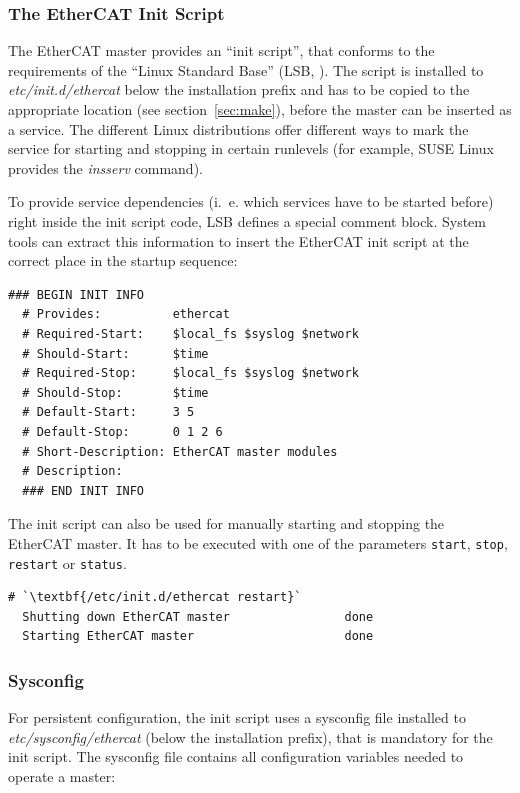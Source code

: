 \documentclass[a4paper,12pt,BCOR6mm,bibtotoc,idxtotoc]{scrbook}
\begin{document}
\subsubsection{The EtherCAT Init Script}
\label{sec:init}

The EtherCAT master provides an ``init script'', that conforms to the
requirements of the ``Linux Standard Base'' (LSB,
\cite{lsb}). The script is installed to \textit{etc/init.d/ethercat}
below the installation prefix and has to be copied to the appropriate
location (see section~\ref{sec:make}), before the master can be
inserted as a service. The different Linux distributions offer
different ways to mark the service for starting and stopping in
certain runlevels (for example, SUSE Linux provides the
\textit{insserv} command).

To provide service dependencies (i.~e. which services have to be
started before) right inside the init script code, LSB defines a
special comment block. System tools can extract this information to
insert the EtherCAT init script at the correct place in the startup
sequence:

\begin{lstlisting}[gobble=2]
  ### BEGIN INIT INFO
  # Provides:          ethercat
  # Required-Start:    $local_fs $syslog $network
  # Should-Start:      $time
  # Required-Stop:     $local_fs $syslog $network
  # Should-Stop:       $time
  # Default-Start:     3 5
  # Default-Stop:      0 1 2 6
  # Short-Description: EtherCAT master modules
  # Description:
  ### END INIT INFO
\end{lstlisting}

The init script can also be used for manually starting and stopping
the EtherCAT master. It has to be executed with one of the parameters
\texttt{start}, \texttt{stop}, \texttt{restart} or \texttt{status}.

\begin{lstlisting}[gobble=2]
  # `\textbf{/etc/init.d/ethercat restart}`
  Shutting down EtherCAT master                done
  Starting EtherCAT master                     done
\end{lstlisting}

\subsubsection{Sysconfig} %
\label{sec:sysconfig}

For persistent configuration, the init script uses a sysconfig file
installed to \textit{etc/sysconfig/ethercat} (below the installation
prefix), that is mandatory for the init script. The sysconfig file
contains all configuration variables needed to operate a master:
\end{document}
